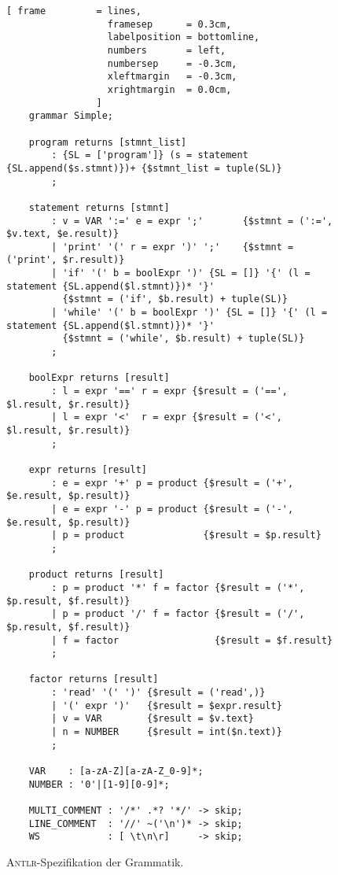 \begin{figure}[!ht]
\centering
\begin{Verbatim}[ frame         = lines, 
                  framesep      = 0.3cm, 
                  labelposition = bottomline,
                  numbers       = left,
                  numbersep     = -0.3cm,
                  xleftmargin   = -0.3cm,
                  xrightmargin  = 0.0cm,
                ]
    grammar Simple;
    
    program returns [stmnt_list] 
        : {SL = ['program']} (s = statement {SL.append($s.stmnt)})+ {$stmnt_list = tuple(SL)}
        ;
    
    statement returns [stmnt]
        : v = VAR ':=' e = expr ';'       {$stmnt = (':=', $v.text, $e.result)}
        | 'print' '(' r = expr ')' ';'    {$stmnt = ('print', $r.result)}
        | 'if' '(' b = boolExpr ')' {SL = []} '{' (l = statement {SL.append($l.stmnt)})* '}' 
          {$stmnt = ('if', $b.result) + tuple(SL)}
        | 'while' '(' b = boolExpr ')' {SL = []} '{' (l = statement {SL.append($l.stmnt)})* '}' 
          {$stmnt = ('while', $b.result) + tuple(SL)}
        ;
    
    boolExpr returns [result]
        : l = expr '==' r = expr {$result = ('==', $l.result, $r.result)} 
        | l = expr '<'  r = expr {$result = ('<',  $l.result, $r.result)}
        ;
    
    expr returns [result]
        : e = expr '+' p = product {$result = ('+', $e.result, $p.result)}
        | e = expr '-' p = product {$result = ('-', $e.result, $p.result)}
        | p = product              {$result = $p.result}
        ;
    
    product returns [result]
        : p = product '*' f = factor {$result = ('*', $p.result, $f.result)}
        | p = product '/' f = factor {$result = ('/', $p.result, $f.result)}
        | f = factor                 {$result = $f.result}
        ;
    
    factor returns [result]
        : 'read' '(' ')' {$result = ('read',)}
        | '(' expr ')'   {$result = $expr.result}
        | v = VAR        {$result = $v.text}
        | n = NUMBER     {$result = int($n.text)}
        ;
    
    VAR    : [a-zA-Z][a-zA-Z_0-9]*;
    NUMBER : '0'|[1-9][0-9]*;
    
    MULTI_COMMENT : '/*' .*? '*/' -> skip;
    LINE_COMMENT  : '//' ~('\n')* -> skip;
    WS            : [ \t\n\r]     -> skip;
\end{Verbatim}
\vspace*{-0.3cm} %
\caption{\textsc{Antlr}-Spezifikation der Grammatik.}
\label{fig:Simple.g}
\end{figure}


